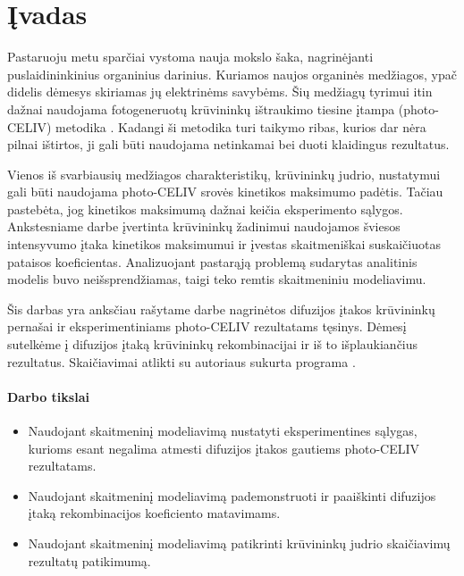 \section{Įvadas}

Pastaruoju metu sparčiai vystoma nauja mokslo šaka, nagrinėjanti puslaidininkinius organinius darinius. Kuriamos naujos organinės medžiagos, ypač didelis dėmesys skiriamas jų elektrinėms savybėms. Šių medžiagų tyrimui itin dažnai naudojama fotogeneruotų krūvininkų ištraukimo tiesine įtampa (photo-CELIV) metodika \cite{juška:4946}. Kadangi ši metodika turi taikymo ribas, kurios dar nėra pilnai ištirtos, ji gali būti naudojama netinkamai bei duoti klaidingus rezultatus.

Vienos iš svarbiausių medžiagos charakteristikų, krūvininkų judrio, nustatymui gali būti naudojama photo-CELIV srovės kinetikos maksimumo padėtis. Tačiau pastebėta, jog kinetikos maksimumą dažnai keičia eksperimento sąlygos. Ankstesniame darbe įvertinta krūvininkų žadinimui naudojamos šviesos intensyvumo įtaka kinetikos maksimumui \cite{juška:155202} ir įvestas skaitmeniškai suskaičiuotas pataisos koeficientas. Analizuojant pastarąją problemą sudarytas analitinis modelis buvo neišsprendžiamas, taigi teko remtis skaitmeniniu modeliavimu. 

Šis darbas yra anksčiau rašytame darbe \cite{vytis:kursinis} nagrinėtos difuzijos įtakos krūvininkų pernašai ir eksperimentiniams photo-CELIV rezultatams tęsinys. Dėmesį sutelkėme į difuzijos įtaką krūvininkų rekombinacijai ir iš to išplaukiančius rezultatus. Skaičiavimai atlikti su autoriaus sukurta programa \cite{vytis:openreadings2010}. 

\paragraph{Darbo tikslai}
\begin{itemize}
\item Naudojant skaitmeninį modeliavimą nustatyti eksperimentines sąlygas, kurioms esant negalima atmesti difuzijos įtakos gautiems photo-CELIV rezultatams.
\item Naudojant skaitmeninį modeliavimą pademonstruoti ir paaiškinti difuzijos įtaką rekombinacijos koeficiento matavimams.
\item Naudojant skaitmeninį modeliavimą patikrinti krūvininkų judrio skaičiavimų rezultatų patikimumą.
\end{itemize}
